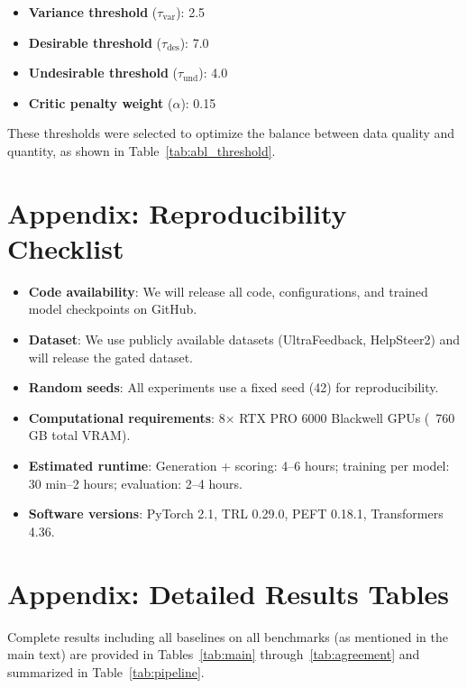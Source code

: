 \documentclass{article}
\begin{document}
\begin{itemize}[leftmargin=*,itemsep=0.5ex]
  \item \textbf{Variance threshold} ($\tau_{\text{var}}$): 2.5
  \item \textbf{Desirable threshold} ($\tau_{\text{des}}$): 7.0
  \item \textbf{Undesirable threshold} ($\tau_{\text{und}}$): 4.0
  \item \textbf{Critic penalty weight} ($\alpha$): 0.15
\end{itemize}

These thresholds were selected to optimize the balance between data quality and quantity, as shown in Table~\ref{tab:abl_threshold}.

\section{Appendix: Reproducibility Checklist}
\label{app:reproducibility}

\begin{itemize}[leftmargin=*,itemsep=0.5ex]
  \item \textbf{Code availability}: We will release all code, configurations, and trained model checkpoints on GitHub.
  \item \textbf{Dataset}: We use publicly available datasets (UltraFeedback, HelpSteer2) and will release the gated dataset.
  \item \textbf{Random seeds}: All experiments use a fixed seed (42) for reproducibility.
  \item \textbf{Computational requirements}: 8× RTX PRO 6000 Blackwell GPUs (~760 GB total VRAM).
  \item \textbf{Estimated runtime}: Generation + scoring: 4--6 hours; training per model: 30 min--2 hours; evaluation: 2--4 hours.
  \item \textbf{Software versions}: PyTorch 2.1, TRL 0.29.0, PEFT 0.18.1, Transformers 4.36.
\end{itemize}

\section{Appendix: Detailed Results Tables}
\label{app:results}

Complete results including all baselines on all benchmarks (as mentioned in the main text) are provided in Tables~\ref{tab:main} through~\ref{tab:agreement} and summarized in Table~\ref{tab:pipeline}.
\end{document}
